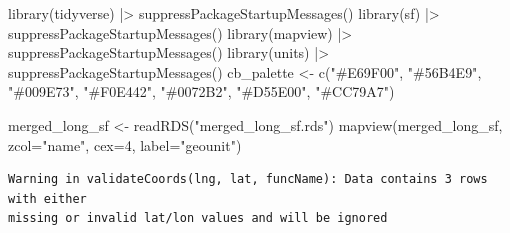 \documentclass[
  letterpaper,
  DIV=11,
  numbers=noendperiod]{scrartcl}
\newenvironment{Shaded}{\begin{snugshade}}{\end{snugshade}}
\newcommand{\AttributeTok}[1]{\textcolor[rgb]{0.40,0.45,0.13}{#1}}
\newcommand{\DecValTok}[1]{\textcolor[rgb]{0.68,0.00,0.00}{#1}}
\newcommand{\FunctionTok}[1]{\textcolor[rgb]{0.28,0.35,0.67}{#1}}
\newcommand{\NormalTok}[1]{\textcolor[rgb]{0.00,0.23,0.31}{#1}}
\newcommand{\OtherTok}[1]{\textcolor[rgb]{0.00,0.23,0.31}{#1}}
\newcommand{\SpecialCharTok}[1]{\textcolor[rgb]{0.37,0.37,0.37}{#1}}
\newcommand{\StringTok}[1]{\textcolor[rgb]{0.13,0.47,0.30}{#1}}
\begin{document}
\begin{Shaded}
\begin{Highlighting}[]
\FunctionTok{library}\NormalTok{(tidyverse) }\SpecialCharTok{|\textgreater{}} \FunctionTok{suppressPackageStartupMessages}\NormalTok{()}
\FunctionTok{library}\NormalTok{(sf) }\SpecialCharTok{|\textgreater{}} \FunctionTok{suppressPackageStartupMessages}\NormalTok{()}
\FunctionTok{library}\NormalTok{(mapview) }\SpecialCharTok{|\textgreater{}} \FunctionTok{suppressPackageStartupMessages}\NormalTok{()}
\FunctionTok{library}\NormalTok{(units) }\SpecialCharTok{|\textgreater{}} \FunctionTok{suppressPackageStartupMessages}\NormalTok{()}
\NormalTok{cb\_palette }\OtherTok{\textless{}{-}} \FunctionTok{c}\NormalTok{(}\StringTok{"\#E69F00"}\NormalTok{, }\StringTok{"\#56B4E9"}\NormalTok{, }\StringTok{"\#009E73"}\NormalTok{, }\StringTok{"\#F0E442"}\NormalTok{, }\StringTok{"\#0072B2"}\NormalTok{, }\StringTok{"\#D55E00"}\NormalTok{, }\StringTok{"\#CC79A7"}\NormalTok{)}
\end{Highlighting}
\end{Shaded}

\begin{Shaded}
\begin{Highlighting}[]
\NormalTok{merged\_long\_sf }\OtherTok{\textless{}{-}} \FunctionTok{readRDS}\NormalTok{(}\StringTok{"merged\_long\_sf.rds"}\NormalTok{)}
\FunctionTok{mapview}\NormalTok{(merged\_long\_sf, }\AttributeTok{zcol=}\StringTok{"name"}\NormalTok{, }\AttributeTok{cex=}\DecValTok{4}\NormalTok{, }\AttributeTok{label=}\StringTok{"geounit"}\NormalTok{)}
\end{Highlighting}
\end{Shaded}

\begin{verbatim}
Warning in validateCoords(lng, lat, funcName): Data contains 3 rows with either
missing or invalid lat/lon values and will be ignored
\end{verbatim}
\end{document}
